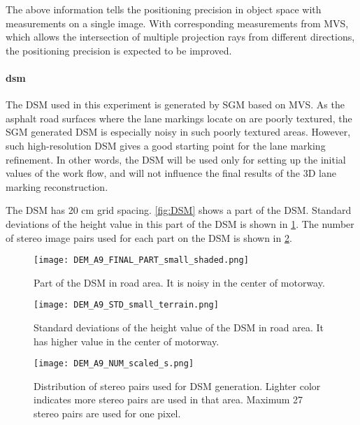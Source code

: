 The above information tells the positioning precision in object space with measurements on a single image. With corresponding measurements from MVS, which allows the intersection of multiple projection rays from different directions, the positioning precision is expected to be improved.%



\paragraph{\gls{dsm}}
The DSM used in this experiment is generated by SGM based on MVS. As the asphalt road surfaces where the lane markings locate on are poorly textured, the SGM generated DSM is especially noisy in such poorly textured areas. However, such high-resolution DSM gives a good starting point for the lane marking refinement. In other words, the DSM will be used only for setting up the initial values of the work flow, and will not influence the final results of the 3D lane marking reconstruction.

The DSM has 20 cm grid spacing. \cref{fig:DSM} shows a part of the DSM. Standard deviations of the height value in this part of the DSM is shown in \cref{fig:DSMstd}. The number of stereo image pairs used for each part on the DSM is shown in \cref{fig:DSMnumber}.

\begin{figure}%
  \centering
  \texttt{[image: DEM\_A9\_FINAL\_PART\_small\_shaded.png]}
  \caption{\small Part of the DSM in road area. It is noisy in the center of motorway.}
  \label{fig:DSM}
  \vspace{1cm}
  \texttt{[image: DEM\_A9\_STD\_small\_terrain.png]}
  \caption{\small Standard deviations of the height value of the DSM in road area. It has higher value in the center of motorway.}
  \label{fig:DSMstd}

\end{figure}

\begin{figure}%
  \centering
  \texttt{[image: DEM\_A9\_NUM\_scaled\_s.png]}
  \caption{\small Distribution of stereo pairs used for DSM generation. Lighter color indicates more stereo pairs are used in that area. Maximum 27 stereo pairs are used for one pixel.}%
  \label{fig:DSMnumber}
\end{figure}


